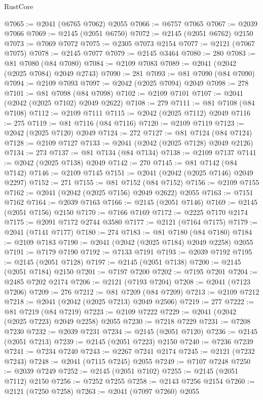 \begin{lexlean}{RustCore}
\begin{coremodule}
@7065 := @2041 (@6765 @7062) @2055
@7066 := @6757 @7065
@7067 := @2039 @7066
@7069 := @2145 (@2051 @6750)
@7072 := @2145 (@2051 @6762) @2150
@7073 := @7069 @7072
@7075 := @2305 @7073 @2154
@7077 := @2121 (@7067 @7075)
@7078 := @2145 @7077
@7079 := @2145 @3464
@7080 := 280
@7083 := @81 @7080 (@84 @7080)
@7084 := @2109 @7083
@7089 := @2041 (@2042 (@2025 @7084) @2049 @2743)
@7090 := 281
@7093 := @81 @7090 (@84 @7090)
@7094 := @2109 @7093
@7097 := @2042 (@2025 @7094) @2049
@7098 := 278
@7101 := @81 @7098 (@84 @7098)
@7102 := @2109 @7101
@7107 := @2041 (@2042 (@2025 @7102) @2049 @2622)
@7108 := 279
@7111 := @81 @7108 (@84 @7108)
@7112 := @2109 @7111
@7115 := @2042 (@2025 @7112) @2049
@7116 := 275
@7119 := @81 @7116 (@84 @7116)
@7120 := @2109 @7119
@7123 := @2042 (@2025 @7120) @2049
@7124 := 272
@7127 := @81 @7124 (@84 @7124)
@7128 := @2109 @7127
@7133 := @2041 (@2042 (@2025 @7128) @2049 @2126)
@7134 := 273
@7137 := @81 @7134 (@84 @7134)
@7138 := @2109 @7137
@7141 := @2042 (@2025 @7138) @2049
@7142 := 270
@7145 := @81 @7142 (@84 @7142)
@7146 := @2109 @7145
@7151 := @2041 (@2042 (@2025 @7146) @2049 @2297)
@7152 := 271
@7155 := @81 @7152 (@84 @7152)
@7156 := @2109 @7155
@7162 := @2041 (@2042 (@2025 @7156) @2049 @2622) @2055
@7163 := @7151 @7162
@7164 := @2039 @7163
@7166 := @2145 (@2051 @7146)
@7169 := @2145 (@2051 @7156) @2150
@7170 := @7166 @7169
@7172 := @2225 @7170 @2174
@7175 := @2091 @7172 @2744 @3580
@7177 := @2121 (@7164 @7175)
@7179 := @2041 (@7141 @7177)
@7180 := 274
@7183 := @81 @7180 (@84 @7180)
@7184 := @2109 @7183
@7190 := @2041 (@2042 (@2025 @7184) @2049 @2258) @2055
@7191 := @7179 @7190
@7192 := @7133 @7191
@7193 := @2039 @7192
@7195 := @2145 (@2051 @7128)
@7197 := @2145 (@2051 @7138)
@7200 := @2145 (@2051 @7184) @2150
@7201 := @7197 @7200
@7202 := @7195 @7201
@7204 := @2485 @7202 @2174
@7206 := @2121 (@7193 @7204)
@7208 := @2041 (@7123 @7206)
@7209 := 276
@7212 := @81 @7209 (@84 @7209)
@7213 := @2109 @7212
@7218 := @2041 (@2042 (@2025 @7213) @2049 @2506)
@7219 := 277
@7222 := @81 @7219 (@84 @7219)
@7223 := @2109 @7222
@7229 := @2041 (@2042 (@2025 @7223) @2049 @2258) @2055
@7230 := @7218 @7229
@7231 := @7208 @7230
@7232 := @2039 @7231
@7234 := @2145 (@2051 @7120)
@7236 := @2145 (@2051 @7213)
@7239 := @2145 (@2051 @7223) @2150
@7240 := @7236 @7239
@7241 := @7234 @7240
@7243 := @2267 @7241 @2174
@7245 := @2121 (@7232 @7243)
@7248 := @2041 (@7115 @7245) @2055
@7249 := @7107 @7248
@7250 := @2039 @7249
@7252 := @2145 (@2051 @7102)
@7255 := @2145 (@2051 @7112) @2150
@7256 := @7252 @7255
@7258 := @2143 @7256 @2154
@7260 := @2121 (@7250 @7258)
@7263 := @2041 (@7097 @7260) @2055

\end{coremodule}
\end{lexlean}

